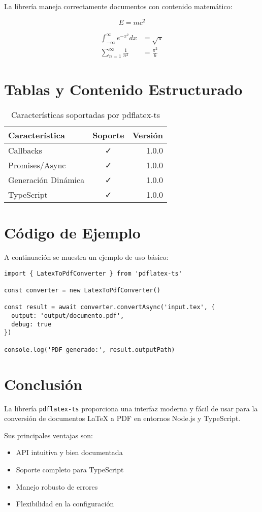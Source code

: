 \documentclass[12pt]{article}
\begin{document}
La librería maneja correctamente documentos con contenido matemático:

\begin{equation}
    E = mc^2
\end{equation}

\begin{align}
    \int_{-\infty}^{\infty} e^{-x^2} dx &= \sqrt{\pi} \\
    \sum_{n=1}^{\infty} \frac{1}{n^2} &= \frac{\pi^2}{6}
\end{align}

\section{Tablas y Contenido Estructurado}

\begin{table}[h]
\centering
\begin{tabular}{|l|c|r|}
\hline
\textbf{Característica} & \textbf{Soporte} & \textbf{Versión} \\
\hline
Callbacks & ✓ & 1.0.0 \\
Promises/Async & ✓ & 1.0.0 \\
Generación Dinámica & ✓ & 1.0.0 \\
TypeScript & ✓ & 1.0.0 \\
\hline
\end{tabular}
\caption{Características soportadas por pdflatex-ts}
\end{table}

\section{Código de Ejemplo}

A continuación se muestra un ejemplo de uso básico:

\begin{verbatim}
import { LatexToPdfConverter } from 'pdflatex-ts'

const converter = new LatexToPdfConverter()

const result = await converter.convertAsync('input.tex', {
  output: 'output/documento.pdf',
  debug: true
})

console.log('PDF generado:', result.outputPath)
\end{verbatim}

\section{Conclusión}

La librería \texttt{pdflatex-ts} proporciona una interfaz moderna y fácil de usar para 
la conversión de documentos LaTeX a PDF en entornos Node.js y TypeScript.

Sus principales ventajas son:
\begin{itemize}
    \item API intuitiva y bien documentada
    \item Soporte completo para TypeScript
    \item Manejo robusto de errores
    \item Flexibilidad en la configuración
\end{itemize}
\end{document}

